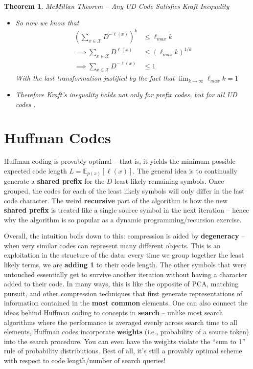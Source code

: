\documentclass[a4paper,12pt]{report}
\newtheorem{theorem}{Theorem}
\begin{document}
\begin{theorem}{McMillan Theorem -- Any UD Code Satisfies Kraft Inequality}
\begin{itemize}
\item So now we know that 
	\begin{align}
		(\sum_{x\in\mathcal X} D^{-\ell(x)})^k &\leq \ell_{max} k \\ 
		\implies \sum_{x\in \mathcal X} D^{\ell(x)} &\leq (\ell_{max} k)^{1/k} \\ 
		\implies \sum_{x \in \mathcal X} D^{-\ell(x)} &\leq 1
	\end{align}
	With the last transformation justified by the fact that $\lim_{k\to\infty}
	\ell_{max} k = 1$

\item Therefore Kraft's inequality holds not only for prefix codes, but for all
UD codes \qedsymbol{}.
\end{itemize}




\end{theorem}






\section{Huffman Codes}

Huffman coding is provably optimal -- that is, it yields the minimum possible
expected code length $L = \mathbb E_{p(x)}[\ell(x)]$. The general idea is to
continually generate a \textbf{shared prefix} for the $D$ least likely remaining
symbols. Once grouped, the codes for each of the least likely symbols will only
differ in the last code character. The weird \textbf{recursive} part of the
algorithm is how the new \textbf{shared prefix} is treated like a single source
symbol in the next iteration -- hence why the algorithm is so popular as a
dynamic programming/recursion exercise. 

Overall, the intuition boils down to this: compression is aided by
\textbf{degeneracy} -- when very similar codes can represent many different
objects. This is an exploitation in the structure of the data: every time we
group together the least likely terms, we are \textbf{adding 1} to their code
length. The other symbols that were untouched essentially get to survive another
iteration without having a character added to their code. In many ways, this is
like the opposite of PCA, matching pursuit, and other compression techniques
that first generate representations of information contained in the \textbf{most
common} elements. One can also connect the ideas behind Huffman coding to
concepts in \textbf{search} -- unlike most search algorithms where the
performance is averaged evenly across search time to all elements, Huffman codes
incorporate \textbf{weights} (i.e., probability of a source token) into the
search procedure. You can even have the weights violate the ``sum to 1'' rule of
probability distributions. Best of all, it's still a provably optimal scheme
with respect to code length/number of search queries!
\end{document}
